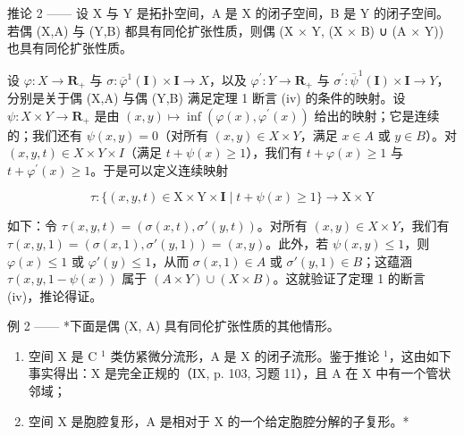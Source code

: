 推论 2 —— 设 X 与 Y 是拓扑空间，A 是 X 的闭子空间，B 是 Y 的闭子空间。若偶 (X,A) 与 (Y,B) 都具有同伦扩张性质，则偶 (X × Y, (X × B) ∪ (A × Y)) 也具有同伦扩张性质。

设 \(\varphi\colon X\to\mathbf{R}_{+}\) 与 \(\sigma\colon\overline{\varphi}^{1}(\mathbf{I})\times\mathbf{I}\to X\)，以及 \(\varphi^{\prime}\colon Y\to\mathbf{R}_{+}\) 与 \(\sigma^{\prime}\colon\overline{\psi}^{1}(\mathbf{I})\times\mathbf{I}\to Y\)，分别是关于偶 (X,A) 与偶 (Y,B) 满足定理 1 断言 (iv) 的条件的映射。设 \(\psi\colon X\times Y\to\mathbf{R}_{+}\) 是由 \((x,y)\mapsto\inf(\varphi(x),\varphi^{\prime}(x))\) 给出的映射；它是连续的；我们还有 \(\psi(x,y)=0\)（对所有 \((x,y)\in X\times Y\)，满足 \(x\in A\) 或 \(y\in B\)）。对 \((x,y,t)\in X\times Y\times I\)（满足 \(t+\psi(x)\geqslant1\)），我们有 \(t+\varphi(x)\geqslant1\) 与 \(t+\varphi^{\prime}(x)\geqslant1\)。于是可以定义连续映射

\[
\tau \colon \{(x, y, t) \in \mathrm{X} \times \mathrm{Y} \times \mathbf {I} \mid t + \psi (x) \geqslant 1 \} \rightarrow \mathrm{X} \times \mathrm{Y}
\]

如下：令 \(\tau(x,y,t) = (\sigma(x,t),\sigma'(y,t))\)。对所有 \((x,y)\in X\times Y\)，我们有 \(\tau(x,y,1) = (\sigma(x,1),\sigma'(y,1)) = (x,y)\)。此外，若 \(\psi(x,y)\leqslant 1\)，则 \(\varphi(x)\leqslant 1\) 或 \(\varphi'(y)\leqslant 1\)，从而 \(\sigma(x,1)\in A\) 或 \(\sigma'(y,1)\in B\)；这蕴涵 \(\tau(x,y,1 - \psi(x))\) 属于 \((A\times Y)\cup (X\times B)\)。这就验证了定理 1 的断言 (iv)，推论得证。

例 2 —— *下面是偶 (X, A) 具有同伦扩张性质的其他情形。

\begin{enumerate}
\def\labelenumi{(\roman{enumi})}
\item
  空间 X 是 C \(^{1}\) 类仿紧微分流形，A 是 X 的闭子流形。鉴于推论 \(^{1}\)，这由如下事实得出：X 是完全正规的（IX, p. 103, 习题 11），且 A 在 X 中有一个管状邻域；
\item
  空间 X 是胞腔复形，A 是相对于 X 的一个给定胞腔分解的子复形。*
\end{enumerate}
